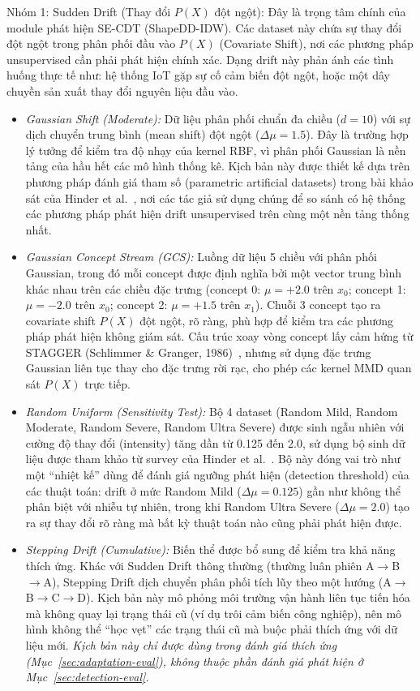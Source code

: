 Nhóm 1: Sudden Drift (Thay đổi $P(X)$ đột ngột): Đây là trọng tâm chính của module phát hiện SE-CDT (ShapeDD-IDW). Các dataset này chứa sự thay đổi đột ngột trong phân phối đầu vào $P(X)$ (Covariate Shift), nơi các phương pháp unsupervised cần phải phát hiện chính xác. Dạng drift này phản ánh các tình huống thực tế như: hệ thống IoT gặp sự cố cảm biến đột ngột, hoặc một dây chuyền sản xuất thay đổi nguyên liệu đầu vào.
\begin{itemize}
	\item \textit{Gaussian Shift (Moderate):} Dữ liệu phân phối chuẩn đa chiều ($d=10$) với sự dịch chuyển trung bình (mean shift) đột ngột ($\Delta\mu = 1.5$). Đây là trường hợp lý tưởng để kiểm tra độ nhạy của kernel RBF, vì phân phối Gaussian là nền tảng của hầu hết các mô hình thống kê. Kịch bản này được thiết kế dựa trên phương pháp đánh giá tham số (parametric artificial datasets) trong bài khảo sát của Hinder et al.~\cite{hinder2024survey_partA}, nơi các tác giả sử dụng chúng để so sánh có hệ thống các phương pháp phát hiện drift unsupervised trên cùng một nền tảng thống nhất.

	\item \textit{Gaussian Concept Stream (GCS):} Luồng dữ liệu 5 chiều với phân phối Gaussian, trong đó mỗi concept được định nghĩa bởi một vector trung bình khác nhau trên các chiều đặc trưng (concept 0: $\mu = +2.0$ trên $x_0$; concept 1: $\mu = -2.0$ trên $x_0$; concept 2: $\mu = +1.5$ trên $x_1$). Chuỗi 3 concept tạo ra covariate shift $P(X)$ đột ngột, rõ ràng, phù hợp để kiểm tra các phương pháp phát hiện không giám sát. Cấu trúc xoay vòng concept lấy cảm hứng từ STAGGER (Schlimmer \& Granger, 1986)~\cite{schlimmer1986incremental}, nhưng sử dụng đặc trưng Gaussian liên tục thay cho đặc trưng rời rạc, cho phép các kernel MMD quan sát $P(X)$ trực tiếp.

	\item \textit{Random Uniform (Sensitivity Test):} Bộ 4 dataset (Random Mild, Random Moderate, Random Severe, Random Ultra Severe) được sinh ngẫu nhiên với cường độ thay đổi (intensity) tăng dần từ 0.125 đến 2.0, sử dụng bộ sinh dữ liệu được tham khảo từ survey của Hinder et al.~\cite{hinder2024survey_partA}. Bộ này đóng vai trò như một ``nhiệt kế'' dùng để đánh giá ngưỡng phát hiện (detection threshold) của các thuật toán: drift ở mức Random Mild ($\Delta\mu = 0.125$) gần như không thể phân biệt với nhiễu tự nhiên, trong khi Random Ultra Severe ($\Delta\mu = 2.0$) tạo ra sự thay đổi rõ ràng mà bất kỳ thuật toán nào cũng phải phát hiện được.

	\item \textit{Stepping Drift (Cumulative):} Biến thể được bổ sung để kiểm tra khả năng thích ứng. Khác với Sudden Drift thông thường (thường luân phiên A$\to$B$\to$A), Stepping Drift dịch chuyển phân phối tích lũy theo một hướng (A$\to$B$\to$C$\to$D). Kịch bản này mô phỏng môi trường vận hành liên tục tiến hóa mà không quay lại trạng thái cũ (ví dụ trôi cảm biến công nghiệp), nên mô hình không thể ``học vẹt'' các trạng thái cũ mà buộc phải thích ứng với dữ liệu mới. \textit{Kịch bản này chỉ được dùng trong đánh giá thích ứng (Mục~\ref{sec:adaptation-eval}), không thuộc phần đánh giá phát hiện ở Mục~\ref{sec:detection-eval}.}
\end{itemize}

